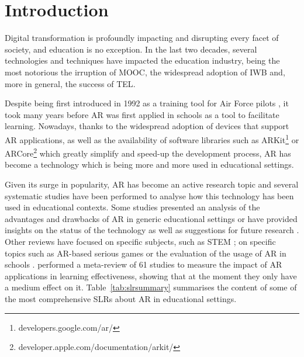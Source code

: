 \section{Introduction} \label{sec:introduction}
Digital transformation is profoundly impacting and disrupting every facet of society, and education is no exception. In the last two decades, several technologies and techniques have impacted the education industry, being the most notorious the irruption of \gls{MOOC}, the widespread adoption of \gls{IWB} and, more in general, the success of \gls{TEL}. 

Despite being first introduced in 1992 as a training tool for Air Force pilots \citep{caudell1992augmented}, it took many years before \gls{AR} was first applied in schools as a tool to facilitate learning. Nowadays, thanks to the widespread adoption of devices that support \gls{AR} applications, as well as the availability of software libraries such as ARKit\footnote{developers.google.com/ar/}
or ARCore\footnote{developer.apple.com/documentation/arkit/} which greatly simplify and speed-up the development process, \gls{AR} has become a technology which is being more and more used in educational settings.

Given its surge in popularity, \gls{AR} has become an active research topic and several systematic studies have been performed to analyse how this technology has been used in educational contexts. Some studies presented an analysis of the advantages and drawbacks of \gls{AR} in generic educational settings \citep{akccayir2017advantages, radu2014augmented, diegmann2015benefits} or have provided insights on the status of the technology as well as suggestions for future research \citep{cheng2013affordances, arici2019research, bacca2014augmented, pellas2019augmenting}. Other reviews have focused on specific subjects, such as \gls{STEM} \citep{ibanez2018augmented, nielsen2016augmented}; on specific topics such as \gls{AR}-based serious games \citep{li2017augmented, bartolome2011can, laine2018mobile} or the evaluation of the usage of \gls{AR} in schools \citep{da2019perspectives, chen2017review}. \citet{garzon2019systematic} performed a meta-review of 61 studies to measure the impact of \gls{AR} applications in learning effectiveness, showing that at the moment they only have a medium effect on it. Table~\ref{tab:slrsummary} summarises the content of some of the most comprehensive \glspl{SLR} about \gls{AR} in educational settings.

